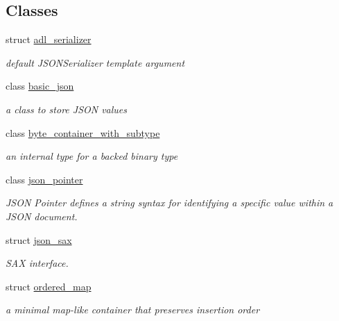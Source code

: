 \subsection*{Classes}
\begin{DoxyCompactItemize}
\item 
struct \hyperlink{structnlohmann_1_1adl__serializer}{adl\+\_\+serializer}
\begin{DoxyCompactList}\small\item\em default J\+S\+O\+N\+Serializer template argument \end{DoxyCompactList}\item 
class \hyperlink{classnlohmann_1_1basic__json}{basic\+\_\+json}
\begin{DoxyCompactList}\small\item\em a class to store J\+S\+ON values \end{DoxyCompactList}\item 
class \hyperlink{classnlohmann_1_1byte__container__with__subtype}{byte\+\_\+container\+\_\+with\+\_\+subtype}
\begin{DoxyCompactList}\small\item\em an internal type for a backed binary type \end{DoxyCompactList}\item 
class \hyperlink{classnlohmann_1_1json__pointer}{json\+\_\+pointer}
\begin{DoxyCompactList}\small\item\em J\+S\+ON Pointer defines a string syntax for identifying a specific value within a J\+S\+ON document. \end{DoxyCompactList}\item 
struct \hyperlink{structnlohmann_1_1json__sax}{json\+\_\+sax}
\begin{DoxyCompactList}\small\item\em S\+AX interface. \end{DoxyCompactList}\item 
struct \hyperlink{structnlohmann_1_1ordered__map}{ordered\+\_\+map}
\begin{DoxyCompactList}\small\item\em a minimal map-\/like container that preserves insertion order \end{DoxyCompactList}\end{DoxyCompactItemize}
